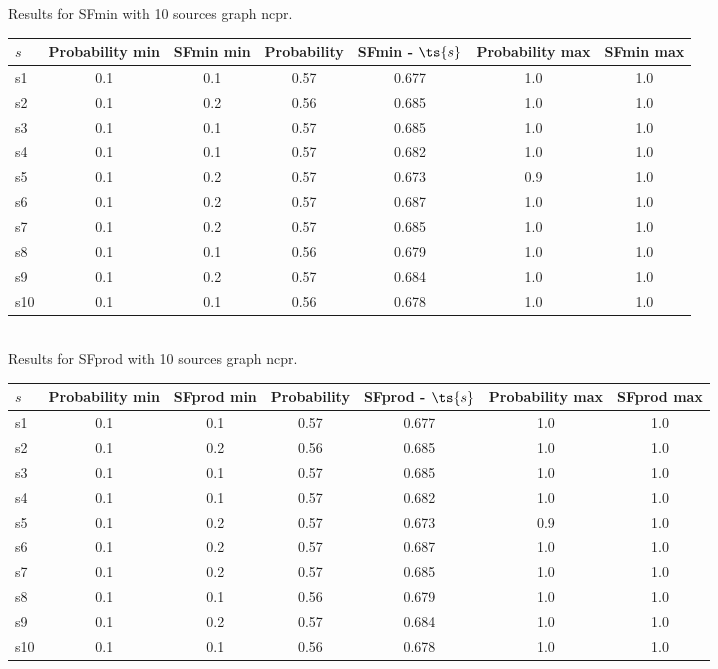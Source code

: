 \documentclass{article}
\begin{document}
\noindent Results for SFmin with 10 sources graph ncpr.

\noindent\begin{tabular}{|l|c|c|c|c|c|c|}
\hline
$s$& Probability min & SFmin min & Probability & SFmin - $\ts{s}$ & Probability max & SFmin max\\
\hline
s1 &0.1 & 0.1 & 0.57 & 0.677 & 1.0 & 1.0\\
\hline
s2 &0.1 & 0.2 & 0.56 & 0.685 & 1.0 & 1.0\\
\hline
s3 &0.1 & 0.1 & 0.57 & 0.685 & 1.0 & 1.0\\
\hline
s4 &0.1 & 0.1 & 0.57 & 0.682 & 1.0 & 1.0\\
\hline
s5 &0.1 & 0.2 & 0.57 & 0.673 & 0.9 & 1.0\\
\hline
s6 &0.1 & 0.2 & 0.57 & 0.687 & 1.0 & 1.0\\
\hline
s7 &0.1 & 0.2 & 0.57 & 0.685 & 1.0 & 1.0\\
\hline
s8 &0.1 & 0.1 & 0.56 & 0.679 & 1.0 & 1.0\\
\hline
s9 &0.1 & 0.2 & 0.57 & 0.684 & 1.0 & 1.0\\
\hline
s10 &0.1 & 0.1 & 0.56 & 0.678 & 1.0 & 1.0\\
\hline
\end{tabular}\\

\noindent Results for SFprod with 10 sources graph ncpr.

\noindent\begin{tabular}{|l|c|c|c|c|c|c|}
\hline
$s$& Probability min & SFprod min & Probability & SFprod - $\ts{s}$ & Probability max & SFprod max\\
\hline
s1 &0.1 & 0.1 & 0.57 & 0.677 & 1.0 & 1.0\\
\hline
s2 &0.1 & 0.2 & 0.56 & 0.685 & 1.0 & 1.0\\
\hline
s3 &0.1 & 0.1 & 0.57 & 0.685 & 1.0 & 1.0\\
\hline
s4 &0.1 & 0.1 & 0.57 & 0.682 & 1.0 & 1.0\\
\hline
s5 &0.1 & 0.2 & 0.57 & 0.673 & 0.9 & 1.0\\
\hline
s6 &0.1 & 0.2 & 0.57 & 0.687 & 1.0 & 1.0\\
\hline
s7 &0.1 & 0.2 & 0.57 & 0.685 & 1.0 & 1.0\\
\hline
s8 &0.1 & 0.1 & 0.56 & 0.679 & 1.0 & 1.0\\
\hline
s9 &0.1 & 0.2 & 0.57 & 0.684 & 1.0 & 1.0\\
\hline
s10 &0.1 & 0.1 & 0.56 & 0.678 & 1.0 & 1.0\\
\hline
\end{tabular}\\
\end{document}
